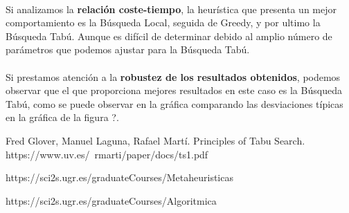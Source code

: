 \documentclass{article}
\begin{document}
	\paragraph{}Si analizamos la \textbf{relación coste-tiempo}, la heurística que presenta un mejor comportamiento es la Búsqueda Local, seguida de Greedy, y por ultimo la Búsqueda Tabú. Aunque es difícil de determinar debido al amplio número de parámetros que podemos ajustar para la Búsqueda Tabú.
	
	\paragraph{}Si prestamos atención a la \textbf{robustez de los resultados obtenidos}, podemos observar que el que proporciona mejores resultados en este caso es la Búsqueda Tabú, como se puede observar en la gráfica comparando las desviaciones típicas en la gráfica de la figura ?.
	
	\begin{thebibliography}{0}
		
		 Fred Glover, Manuel Laguna, Rafael Martí. Principles of Tabu Search. https://www.uv.es/~rmarti/paper/docs/ts1.pdf
		
		 https://sci2s.ugr.es/graduateCourses/Metaheuristicas
		
		https://sci2s.ugr.es/graduateCourses/Algoritmica
		
	\end{thebibliography}
	
\end{document}
